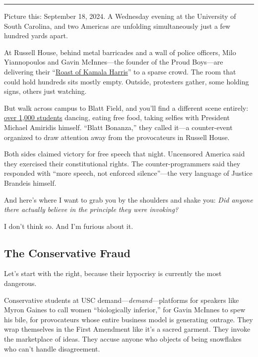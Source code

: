\documentclass[11pt]{article}
\begin{document}
\vspace{0.5cm}
\hrule
\vspace{0.5cm}

\onehalfspacing

Picture this: September 18, 2024. A Wednesday evening at the University of South Carolina, and two Americas are unfolding simultaneously just a few hundred yards apart.

At Russell House, behind metal barricades and a wall of police officers, Milo Yiannopoulos and Gavin McInnes---the founder of the Proud Boys---are delivering their ``\href{https://www.dailygamecock.com/article/2024/09/over-1000-students-attend-blatt-bonanza-during-controversial-campus-event-news-grady}{Roast of Kamala Harris}'' to a sparse crowd. The room that could hold hundreds sits mostly empty. Outside, protesters gather, some holding signs, others just watching.

But walk across campus to Blatt Field, and you'll find a different scene entirely: \href{https://www.dailygamecock.com/article/2024/09/over-1000-students-attend-blatt-bonanza-during-controversial-campus-event-news-grady}{over 1,000 students} dancing, eating free food, taking selfies with President Michael Amiridis himself. ``Blatt Bonanza,'' they called it---a counter-event organized to draw attention away from the provocateurs in Russell House.

Both sides claimed victory for free speech that night. Uncensored America said they exercised their constitutional rights. The counter-programmers said they responded with ``more speech, not enforced silence''---the very language of Justice Brandeis himself.

And here's where I want to grab you by the shoulders and shake you: \textit{Did anyone there actually believe in the principle they were invoking?}

I don't think so. And I'm furious about it.

\subsection{The Conservative Fraud}

Let's start with the right, because their hypocrisy is currently the most dangerous.

Conservative students at USC demand---\textit{demand}---platforms for speakers like Myron Gaines to call women ``biologically inferior,'' for Gavin McInnes to spew his bile, for provocateurs whose entire business model is generating outrage. They wrap themselves in the First Amendment like it's a sacred garment. They invoke the marketplace of ideas. They accuse anyone who objects of being snowflakes who can't handle disagreement.
\end{document}
